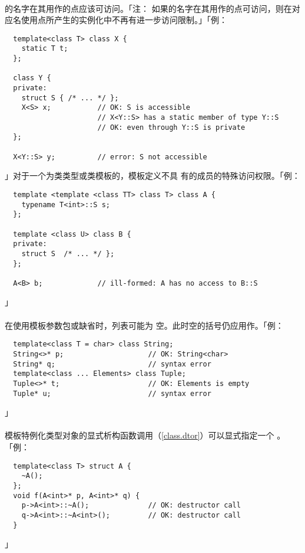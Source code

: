\paragraph{}
的名字在其用作的点应该可访问。「注：
如果的名字在其用作的点可访问，则在对
应名使用点所产生的实例化中不再有进一步访问限制。」「例：
\begin{lstlisting}
  template<class T> class X {
    static T t;
  };

  class Y {
  private:
    struct S { /* ... */ };
    X<S> x;           // OK: S is accessible
                      // X<Y::S> has a static member of type Y::S
                      // OK: even through Y::S is private
  };

  X<Y::S> y;          // error: S not accessible
\end{lstlisting}」对于一个为类类型或类模板的，模板定义不具
有的成员的特殊访问权限。「例：
\begin{lstlisting}
  template <template <class TT> class T> class A {
    typename T<int>::S s;
  };

  template <class U> class B {
  private:
    struct S  /* ... */ };
  };

  A<B> b;             // ill-formed: A has no access to B::S
\end{lstlisting}」

\paragraph{}
在使用模板参数包或缺省时，列表可能为
空。此时空的\tm{<>}括号仍应用作。「例：
\begin{lstlisting}
  template<class T = char> class String;
  String<>* p;                    // OK: String<char>
  String* q;                      // syntax error
  template<class ... Elements> class Tuple;
  Tuple<>* t;                     // OK: Elements is empty
  Tuple* u;                       // syntax error
\end{lstlisting}」

\paragraph{}
模板特例化类型对象的显式析构函数调用（\ref{class.dtor}）可以显式指定一个
。「例：
\begin{lstlisting}
  template<class T> struct A {
    ~A();
  };
  void f(A<int>* p, A<int>* q) {
    p->A<int>::~A();              // OK: destructor call
    q->A<int>::~A<int>();         // OK: destructor call
  }
\end{lstlisting}」

